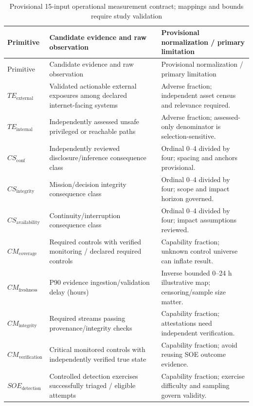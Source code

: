 \documentclass[11pt]{article}
\begin{document}
\begingroup
\small
\setlength{\tabcolsep}{4pt}
\renewcommand{\arraystretch}{1.12}
\begin{longtable}{P{0.22\textwidth} P{0.35\textwidth} P{0.31\textwidth}}
\caption{Provisional 15-input operational measurement contract; mappings and bounds require study validation}
\label{tab:primitive-contract}\\
\toprule
Primitive & Candidate evidence and raw observation & Provisional normalization / primary limitation \\
\midrule
\endfirsthead
\toprule
Primitive & Candidate evidence and raw observation & Provisional normalization / primary limitation \\
\midrule
\endhead
$TE_{\mathrm{external}}$ & Validated actionable external exposures among declared internet-facing systems & Adverse fraction; independent asset census and relevance required. \\
$TE_{\mathrm{internal}}$ & Independently assessed unsafe privileged or reachable paths & Adverse fraction; assessed-only denominator is selection-sensitive. \\
$CS_{\mathrm{conf}}$ & Independently reviewed disclosure/inference consequence class & Ordinal 0--4 divided by four; spacing and anchors provisional. \\
$CS_{\mathrm{integrity}}$ & Mission/decision integrity consequence class & Ordinal 0--4 divided by four; scope and impact horizon governed. \\
$CS_{\mathrm{availability}}$ & Continuity/interruption consequence class & Ordinal 0--4 divided by four; impact assumptions reviewed. \\
$CM_{\mathrm{coverage}}$ & Required controls with verified monitoring / declared required controls & Capability fraction; unknown control universe can inflate result. \\
$CM_{\mathrm{freshness}}$ & P90 evidence ingestion/validation delay (hours) & Inverse bounded 0--24 h illustrative map; censoring/sample size matter. \\
$CM_{\mathrm{integrity}}$ & Required streams passing provenance/integrity checks & Capability fraction; attestations need independent verification. \\
$CM_{\mathrm{verification}}$ & Critical monitored controls with independently verified true state & Capability fraction; avoid reusing SOE outcome evidence. \\
$SOE_{\mathrm{detection}}$ & Controlled detection exercises successfully triaged / eligible attempts & Capability fraction; exercise difficulty and sampling govern validity. \\

\end{longtable}
\end{document}

